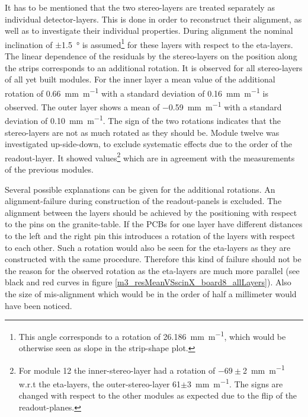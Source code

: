 \documentclass[
twoside,            %
BCOR1.4cm,          %
10pt,               %
headings=normal,    %
headsepline,        %
clearplainpage,		%
final,              %
div=14,
open=right,
bibliography=toc
]{scrreprt}
\begin{document}
It has to be mentioned that the two stereo-layers are treated separately as individual detector-layers.
This is done in order to reconstruct their alignment, as well as to investigate their individual properties.
During alignment the nominal inclination of $\pm$\SI{1.5}{\degree} is assumed\footnote{
	This angle corresponds to a rotation of \SI{26.186}{\mm\per\m}, which would be otherwise seen as slope in the strip-shape plot.
} for these layers with respect to the eta-layers.
The linear dependence of the residuals by the stereo-layers on the position along the strips corresponds to an additional rotation.
It is observed for all stereo-layers of all yet built modules.
For the inner layer a mean value of the additional rotation of \SI{0.66}{\mm\per\m} with a standard deviation of \SI{0.16}{\mm\per\m} is observed.
The outer layer shows a mean of \SI{-0.59}{\mm\per\m} with a standard deviation of \SI{0.10}{\mm\per\m}.
The sign of the two rotations indicates that the stereo-layers are not as much rotated as they should be.
Module twelve was investigated up-side-down, to exclude systematic effects due to the order of the readout-layer.
It showed values\footnote{
	For module 12 the inner-stereo-layer had a rotation of $-69\pm$\SI{2}{\mm\per\m} w.r.t the eta-layers, the outer-stereo-layer  61$\pm$\SI{3}{\mm\per\m}.
	The signs are changed with respect to the other modules as expected due to the flip of the readout-planes.
} which are in agreement with the measurements of the previous modules.
 
Several possible explanations can be given for the additional rotations.
An alignment-failure during construction of the readout-panels is excluded.
The alignment between the layers should be achieved by the positioning with respect to the pins on the granite-table.
If the PCBs for one layer have different distances to the left and the right pin this introduces a rotation of the layers with respect to each other.
Such a rotation would also be seen for the eta-layers as they are constructed with the same procedure.
Therefore this kind of failure should not be the reason for the observed rotation as the eta-layers are much more parallel (see black and red curves in figure \ref{m3_resMeanVSscinX_board8_allLayers}).
Also the size of mis-alignment which would be in the order of half a millimeter would have been noticed.
\end{document}
